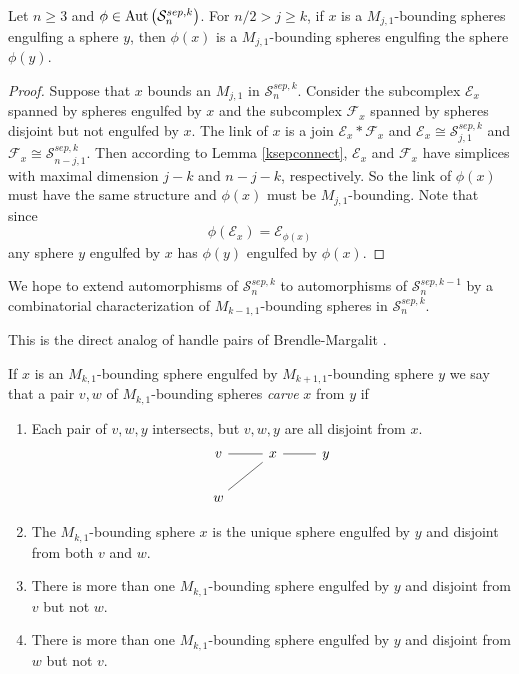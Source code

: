 \begin{lemma}
Let $n\geq 3$ and $\phi \in \operatorname{Aut}{ \left ( \mathcal S^{sep,k}_{n} \right ) }$.
For $n/2>j\geq k$,
if $x$ is a
$M_{j,1}$-bounding spheres
engulfing a sphere $y$,
then $\phi(x)$
is a
$M_{j,1}$-bounding spheres
engulfing the sphere $\phi(y)$.
\label{kengulfschar}
\end{lemma}

\begin{proof}
  Suppose that $x$ bounds an $M_{j,1}$ in $\mathcal S^{sep,k}_{n}$.
  Consider the subcomplex
  $\mathcal E_x$ spanned by spheres engulfed by $x$
  and the subcomplex
  $\mathcal F_x$ spanned by spheres disjoint but not engulfed by $x$.
  The link of $x$ is a join $\mathcal E_x \ast \mathcal F_x$
  and
  $\mathcal E_x \cong \mathcal S^{sep,k}_{j,1}$
  and $\mathcal F_x \cong \mathcal S^{sep,k}_{n-j,1}$.
  Then according to Lemma \ref{ksepconnect},
  $\mathcal E_x$
  and $\mathcal F_x$
  have simplices with maximal dimension
  $j-k$ and $n-j-k$, respectively.
  So the link of $\phi(x)$ must have the same structure
  and $\phi(x)$ must be $M_{j,1}$-bounding.
  Note that since
  $$\phi \left( \mathcal E_x \right) =\mathcal E_{\phi(x)}$$
  any sphere $y$ engulfed by $x$ has $\phi(y)$ engulfed by $\phi(x)$.
\end{proof}

We hope to extend automorphisms of
$\mathcal S^{sep,k}_{n}$ to
automorphisms of $\mathcal S^{sep,k-1}_{n}$
by
a
combinatorial characterization of
$M_{k-1,1}$-bounding spheres in $\mathcal S^{sep,k}_{n}$.

This is the direct analog of handle pairs of Brendle-Margalit \cite{meta}.

\begin{definition}
  If $x$ is an $M_{k,1}$-bounding sphere engulfed by $M_{k+1,1}$-bounding sphere $y$
  we say that a pair $v,w$ of $M_{k,1}$-bounding spheres
  \emph{carve} $x$ from $y$ if
  \begin{enumerate}[(1)]
    \item Each pair of $v,w,y$ intersects, but $v,w,y$ are all disjoint from $x$.
    $$
    \begin{tikzcd}[every arrow/.append style={dash}]
      v \arrow{r} & x \arrow{r} & y\\
      w \arrow{ur} &&
    \end{tikzcd}
    $$
    \item The $M_{k,1}$-bounding sphere $x$ is the unique sphere engulfed by $y$
    and disjoint from both $v$ and $w$.
    \item There is more than one $M_{k,1}$-bounding sphere engulfed by $y$ and disjoint
    from $v$ but not $w$.
    \item There is more than one $M_{k,1}$-bounding sphere engulfed by $y$ and disjoint
    from $w$ but not $v$.
  \end{enumerate}
\end{definition}

